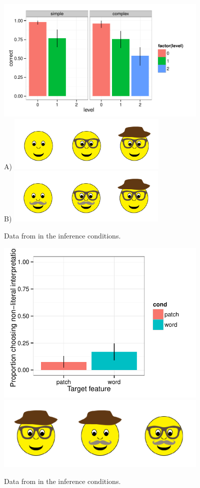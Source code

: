  \begin{figure}[t]
  \centering
  \includegraphics[width=4in]{../plots/3-levels-levels.pdf}\\ 
  A) \includegraphics[width=3in]{figures/hatglasses.pdf}\\
  B) \includegraphics[width=3in]{figures/levels-levels-stim.pdf}
  \caption{\label{fig:levels-level} Data from  in the inference conditions.}
\end{figure}


 \begin{figure}[t]
  \centering
  \includegraphics[width=4in]{../plots/3-levels-oddman.pdf}
  \includegraphics[width=4in]{figures/levels-oddman-stim.pdf}
  \caption{\label{fig:levels-levels} Data from  in the inference conditions.}
\end{figure}

